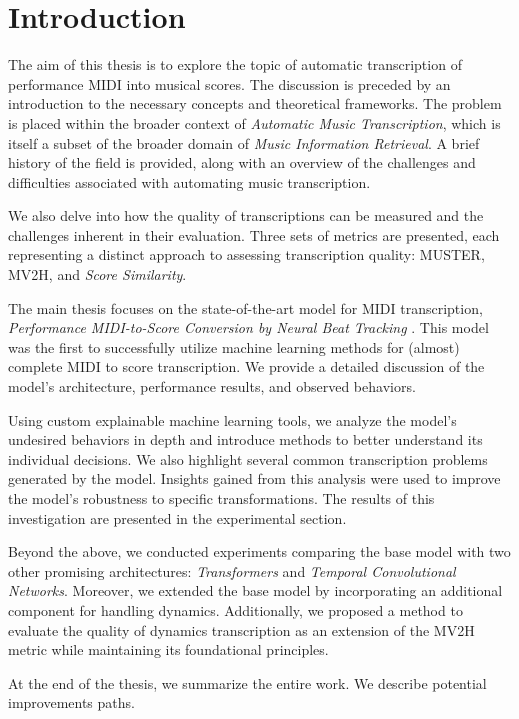\chapter*{Introduction}


The aim of this thesis is to explore the topic of automatic transcription of performance MIDI into musical scores. The discussion is preceded by an introduction to the necessary concepts and theoretical frameworks. The problem is placed within the broader context of \emph{Automatic Music Transcription}, which is itself a subset of the broader domain of \emph{Music Information Retrieval}. A brief history of the field is provided, along with an overview of the challenges and difficulties associated with automating music transcription.

We also delve into how the quality of transcriptions can be measured and the challenges inherent in their evaluation. Three sets of metrics are presented, each representing a distinct approach to assessing transcription quality: MUSTER, MV2H, and \emph{Score Similarity}.

The main thesis focuses on the state-of-the-art model for MIDI transcription, \emph{Performance MIDI-to-Score Conversion by Neural Beat Tracking} \cite{Liu2022}. This model was the first to successfully utilize machine learning methods for (almost) complete MIDI to score transcription. We provide a detailed discussion of the model’s architecture, performance results, and observed behaviors.

Using custom explainable machine learning tools, we analyze the model’s undesired behaviors in depth and introduce methods to better understand its individual decisions. We also highlight several common transcription problems generated by the model. Insights gained from this analysis were used to improve the model’s robustness to specific transformations. The results of this investigation are presented in the experimental section.

Beyond the above, we conducted experiments comparing the base model with two other promising architectures: \emph{Transformers} and \emph{Temporal Convolutional Networks}. Moreover, we extended the base model by incorporating an additional component for handling dynamics. Additionally, we proposed a method to evaluate the quality of dynamics transcription as an extension of the MV2H metric while maintaining its foundational principles.

At the end of the thesis, we summarize the entire work. We describe potential improvements paths.

